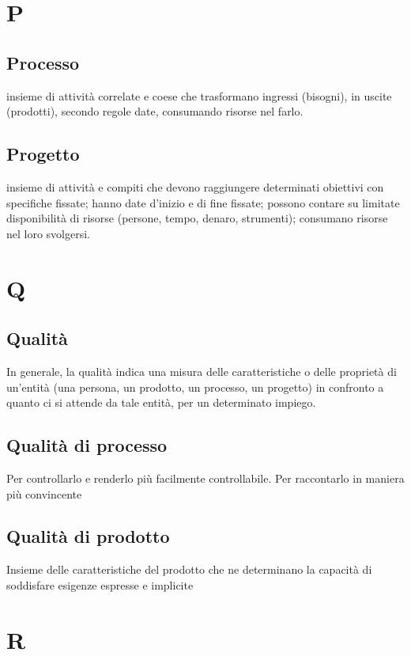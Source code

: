 \documentclass[11pt,a4paper]{article}
\begin{document}
	\section{P}
	\subsection{Processo}
	insieme di attività correlate e coese che trasformano ingressi (bisogni), in uscite (prodotti), secondo regole date, consumando risorse nel farlo.

	\subsection{Progetto}
	insieme di attività e compiti che devono raggiungere determinati
obiettivi con specifiche fissate; hanno date d’inizio e di fine fissate; possono
contare su limitate disponibilità di risorse (persone, tempo, denaro, strumenti); consumano risorse nel loro svolgersi.
	\section{Q}
	\subsection{Qualità}
	In generale, la qualità indica una misura delle caratteristiche o delle proprietà di un’entità (una persona, un prodotto, un processo, un progetto) in confronto a quanto ci si attende da tale entità, per un determinato
impiego.
	\subsection{Qualità di processo}
Per controllarlo e renderlo più facilmente controllabile. Per raccontarlo in maniera più convincente
	\subsection{Qualità di prodotto}
	Insieme delle caratteristiche del prodotto che ne determinano la capacità di soddisfare esigenze espresse e implicite
	\section{R}
\end{document}
